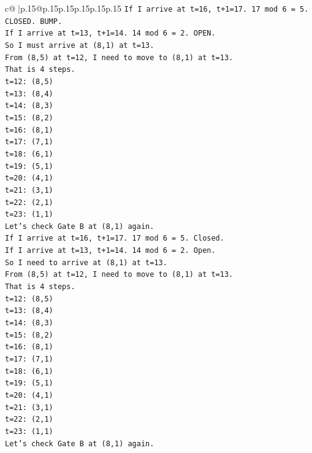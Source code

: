 \documentclass{article}
\begin{document}
{\begin{supertabular}{c@{$\;$}|p{.15\linewidth}@{}p{.15\linewidth}p{.15\linewidth}p{.15\linewidth}p{.15\linewidth}p{.15\linewidth}}
{{{\texttt{If I arrive at t=16, t+1=17. 17 mod 6 = 5. CLOSED. BUMP.} \\
\texttt{If I arrive at t=13, t+1=14. 14 mod 6 = 2. OPEN.} \\
\texttt{So I must arrive at (8,1) at t=13.} \\
\texttt{From (8,5) at t=12, I need to move to (8,1) at t=13.} \\
\texttt{That is 4 steps.} \\
\texttt{t=12: (8,5)} \\
\texttt{t=13: (8,4)} \\
\texttt{t=14: (8,3)} \\
\texttt{t=15: (8,2)} \\
\texttt{t=16: (8,1)} \\
\texttt{t=17: (7,1)} \\
\texttt{t=18: (6,1)} \\
\texttt{t=19: (5,1)} \\
\texttt{t=20: (4,1)} \\
\texttt{t=21: (3,1)} \\
\texttt{t=22: (2,1)} \\
\texttt{t=23: (1,1)} \\
\texttt{Let's check Gate B at (8,1) again.} \\
\texttt{If I arrive at t=16, t+1=17. 17 mod 6 = 5. Closed.} \\
\texttt{If I arrive at t=13, t+1=14. 14 mod 6 = 2. Open.} \\
\texttt{So I need to arrive at (8,1) at t=13.} \\
\texttt{From (8,5) at t=12, I need to move to (8,1) at t=13.} \\
\texttt{That is 4 steps.} \\
\texttt{t=12: (8,5)} \\
\texttt{t=13: (8,4)} \\
\texttt{t=14: (8,3)} \\
\texttt{t=15: (8,2)} \\
\texttt{t=16: (8,1)} \\
\texttt{t=17: (7,1)} \\
\texttt{t=18: (6,1)} \\
\texttt{t=19: (5,1)} \\
\texttt{t=20: (4,1)} \\
\texttt{t=21: (3,1)} \\
\texttt{t=22: (2,1)} \\
\texttt{t=23: (1,1)} \\
\texttt{Let's check Gate B at (8,1) again.} \\
}}}
\end{supertabular}}
\end{document}
